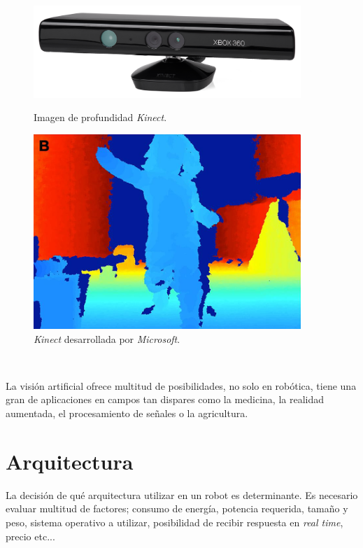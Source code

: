 \begin{figure} [h!]
	\begin{center}
		\begin{minipage}{0.45\textwidth}
			\begin{center}
				\includegraphics[width=0.9\textwidth]{figs/kinect}
			\end{center}
			\caption{Imagen de profundidad \textit{Kinect}.}
		\end{minipage}\hfill
		\begin{minipage}{0.35\textwidth}
			\begin{center}
				\includegraphics[width=0.9\textwidth]{figs/depth}
			\end{center}
			\caption{\textit{Kinect} desarrollada por \textit{Microsoft}.}
		\end{minipage}
	\end{center}
\end{figure}\

La visión artificial ofrece multitud de posibilidades, no solo en robótica, tiene una gran de aplicaciones en campos tan dispares como la medicina, la realidad aumentada, el procesamiento de señales o la agricultura.\\

\section{Arquitectura}
\label{sec:arquitectura}
La decisión de qué arquitectura utilizar en un robot es determinante. Es necesario evaluar multitud de factores; consumo de energía, potencia requerida, tamaño y peso, sistema operativo a utilizar, posibilidad de recibir respuesta en \textit{real time}, precio etc...\\


